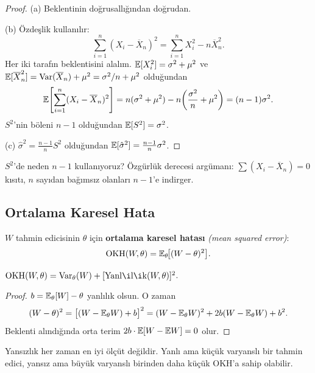 \begin{proof}
(a) Beklentinin doğrusallığından doğrudan.

(b) Özdeşlik kullanılır:
\[
  \sum_{i=1}^n (X_i - \overline{X}_n)^2 = \sum_{i=1}^n X_i^2 - n\overline{X}_n^2.
\]
Her iki tarafın beklentisini alalım. $\mathbb{E}[X_i^2] = \sigma^2 + \mu^2$ ve $\mathbb{E}[\overline{X}_n^2] = \operatorname{Var}(\overline{X}_n) + \mu^2 = \sigma^2/n + \mu^2$ olduğundan
\[
  \mathbb{E}\!\left[\sum_{i=1}^n(X_i-\overline{X}_n)^2\right] = n(\sigma^2+\mu^2) - n\!\left(\frac{\sigma^2}{n}+\mu^2\right) = (n-1)\sigma^2.
\]
$S^2$'nin böleni $n-1$ olduğundan $\mathbb{E}[S^2]=\sigma^2$.

(c) $\hat{\sigma}^2 = \frac{n-1}{n}S^2$ olduğundan $\mathbb{E}[\hat{\sigma}^2] = \frac{n-1}{n}\sigma^2$.
\end{proof}

\begin{kritiksorgu}
$S^2$'de neden $n-1$ kullanıyoruz? Özgürlük derecesi argümanı: $\sum(X_i-\overline{X}_n)=0$ kısıtı, $n$ sayıdan bağımsız olanları $n-1$'e indirger.
\end{kritiksorgu}

\subsection{Ortalama Karesel Hata}

\begin{tanim}[OKH]\label{def:okh}
$W$ tahmin edicisinin $\theta$ için \textbf{ortalama karesel hatası} \emph{(mean squared error)}:
\[
  \mathrm{OKH}(W,\theta) = \mathbb{E}_\theta\!\bigl[(W-\theta)^2\bigr].
\]
\end{tanim}

\begin{teorem}\label{thm:okh_ayrisim}
$\mathrm{OKH}(W,\theta) = \Var_\theta(W) + [\mathrm{Yanlılık}(W,\theta)]^2$.
\end{teorem}

\begin{proof}
$b = \mathbb{E}_\theta[W]-\theta$ yanlılık olsun. O zaman
\[
  (W-\theta)^2 = \bigl[(W-\mathbb{E}_\theta W) + b\bigr]^2
  = (W-\mathbb{E}_\theta W)^2 + 2b(W-\mathbb{E}_\theta W) + b^2.
\]
Beklenti alındığında orta terim $2b\cdot\mathbb{E}[W-\mathbb{E} W]=0$ olur.
\end{proof}

\begin{hataanalizi}
Yansızlık her zaman en iyi ölçüt değildir. Yanlı ama küçük varyanslı bir tahmin edici, yansız ama büyük varyanslı birinden daha küçük OKH'a sahip olabilir.
\end{hataanalizi}

